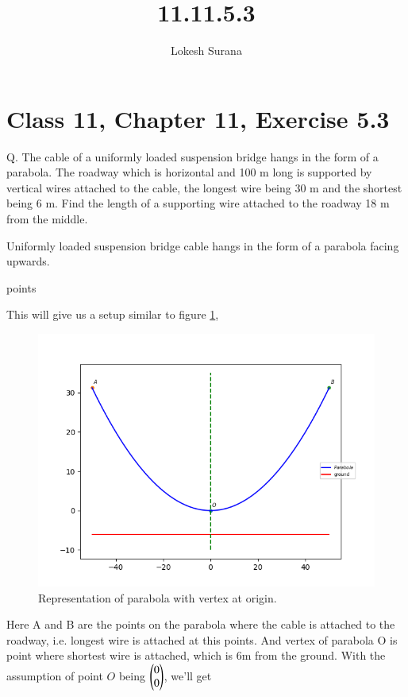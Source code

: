 \documentclass[journal,12pt,twocolumn]{IEEEtran}
\begin{document}
\vspace{3cm}
\title{11.11.5.3}
\author{Lokesh Surana}
\maketitle
\section*{Class 11, Chapter 11, Exercise 5.3}

Q. The cable of a uniformly loaded suspension bridge hangs in the form of a parabola. The roadway which is horizontal and 100 m long is supported by vertical wires attached to the cable, the longest wire being 30 m and the shortest being 6 m. Find the length of a supporting wire attached to the roadway 18 m from the middle.

\solution
Uniformly loaded suspension bridge cable hangs in the form of a parabola facing upwards.

\begin{table}[ht!]
    
    \caption{points}
    \label{tab:points}
\end{table}

This will give us a setup similar to figure \ref{fig:Cable}, 

\begin{figure}[!htb]
    \centering
    \includegraphics[width=\columnwidth]{figs/1.png}
    \caption{Representation of parabola with vertex at origin.}
    \label{fig:Cable}
\end{figure}

Here A and B are the points on the parabola where the cable is attached to the roadway, i.e. longest wire is attached at this points. And vertex of parabola O is point where shortest wire is attached, which is 6m from the ground.
With the assumption of point $O$ being $\begin{pmatrix}0\\0\end{pmatrix}$, we'll get  
\end{document}
